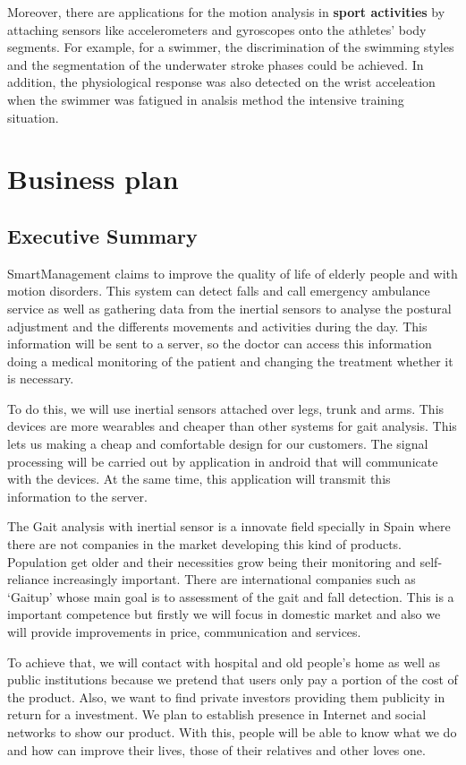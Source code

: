 Moreover, there are applications for the motion analysis in \textbf{sport activities} by attaching sensors like accelerometers and gyroscopes onto the athletes'  body segments. For example, for a swimmer, the discrimination of the swimming styles and the segmentation of the underwater stroke phases could be achieved. In addition, the physiological response was also detected on the wrist acceleation when the swimmer was fatigued in analsis method the intensive training situation\cite{Yuji}.



\section{Business plan }
\subsection{Executive Summary}
SmartManagement claims to improve  the quality of life of elderly  people and with motion disorders. This system can detect falls and call emergency ambulance service as well as gathering data from the inertial sensors to analyse the postural adjustment and the differents movements and activities during the day. This information will be sent to a server, so the doctor can access this information  doing a medical monitoring of the patient and changing the treatment whether it is necessary.

To do this, we will use inertial sensors attached over legs, trunk and arms. This devices are more wearables and cheaper than other systems for gait analysis. This lets us making a cheap and comfortable design for our customers. The signal processing will be carried out by application in android that will communicate with the devices. At the same time, this application will transmit this information to the server.

The Gait analysis with inertial sensor is a innovate field specially in Spain where there are not companies in the market developing this kind of products. Population get older and their necessities grow being their monitoring and self-reliance increasingly important.
There are international companies such as ‘Gaitup’ whose main goal is to assessment of the gait  and fall detection. This is a important competence but firstly we will focus in domestic market and also we will provide improvements in price, communication and services.

To achieve that, we will contact with hospital and old people’s home as well as public institutions because we pretend that users only pay a portion of the cost of the product. Also, we want to find private investors providing them publicity in return for a investment.
We plan to establish presence in Internet and social networks to show our product. With this, people will be able to know what we do and how can improve their lives, those of their relatives and other loves one.

